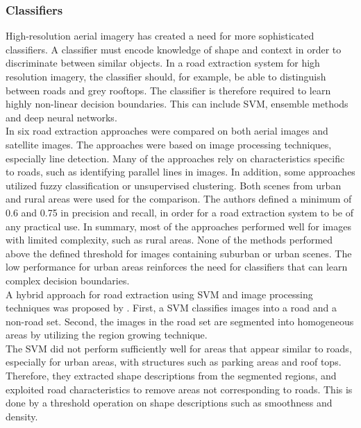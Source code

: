 \subsubsection{Classifiers}
High-resolution aerial imagery has created a need for more sophisticated classifiers. A classifier must encode knowledge of shape and context in order to discriminate between similar objects. In a road extraction system for high resolution imagery, the classifier should, for example, be able to distinguish between roads and grey rooftops. The classifier is therefore required to learn highly non-linear decision boundaries. This can include \ac{SVM}, ensemble methods and deep neural networks.\\

In \cite{Mayer_road_test} six road extraction approaches were compared on both aerial images and satellite images. The approaches were based on image processing techniques, especially line detection. Many of the approaches rely on characteristics specific to roads, such as identifying parallel lines in images. In addition, some approaches utilized fuzzy classification or unsupervised clustering. Both scenes from urban and rural areas were used for the comparison. The authors defined a minimum of 0.6 and 0.75 in precision and recall, in order for a road extraction system to be of any practical use. In summary, most of the approaches performed well for images with limited complexity, such as rural areas. None of the methods performed above the defined threshold for images containing suburban or urban scenes. The low performance for urban areas reinforces the need for classifiers that can learn complex decision boundaries.\\

A hybrid approach for road extraction using \ac{SVM} and image processing techniques was proposed by \cite{Song_road_extraction_svm}. First, a \ac{SVM} classifies images into a road and a non-road set. Second, the images in the road set are segmented into homogeneous areas by utilizing the region growing technique. \\

The \ac{SVM} did not perform sufficiently well for areas that appear similar to roads, especially for urban areas, with structures such as parking areas and roof tops. Therefore, they extracted shape descriptions from the segmented regions, and exploited road characteristics to remove areas not corresponding to roads. This is done by a threshold operation on shape descriptions such as smoothness and density.\\

